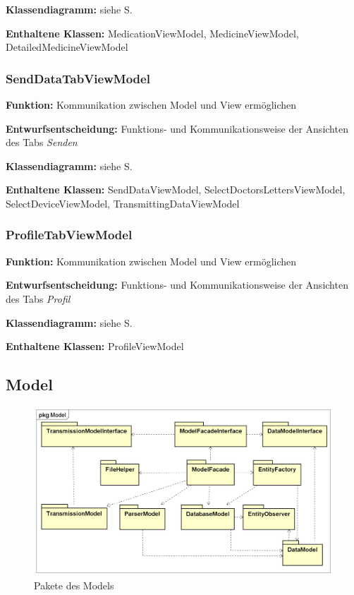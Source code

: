 \documentclass[a4paper]{scrreprt}
\begin{document}
\textbf{Klassendiagramm:} siehe S.

\textbf{Enthaltene Klassen:} MedicationViewModel, MedicineViewModel, DetailedMedicineViewModel

\subsubsection{SendDataTabViewModel}
\textbf{Funktion:} Kommunikation zwischen Model und View ermöglichen

\textbf{Entwurfsentscheidung:} Funktions- und Kommunikationsweise der Ansichten des Tabs \textit{Senden}

\textbf{Klassendiagramm:} siehe S.

\textbf{Enthaltene Klassen:} SendDataViewModel, SelectDoctorsLettersViewModel, SelectDeviceViewModel, TransmittingDataViewModel

\subsubsection{ProfileTabViewModel}
\textbf{Funktion:} Kommunikation zwischen Model und View ermöglichen

\textbf{Entwurfsentscheidung:} Funktions- und Kommunikationsweise der Ansichten des Tabs \textit{Profil}

\textbf{Klassendiagramm:} siehe S.

\textbf{Enthaltene Klassen:} ProfileViewModel

\subsection{Model}
\begin{figure}[H]
\centering
\includegraphics[width=0.75\textheight]{graphics/Klassendiagramme/Model/ModelPackage.png}
\caption{Pakete des Models}
\end{figure}
\end{document}
